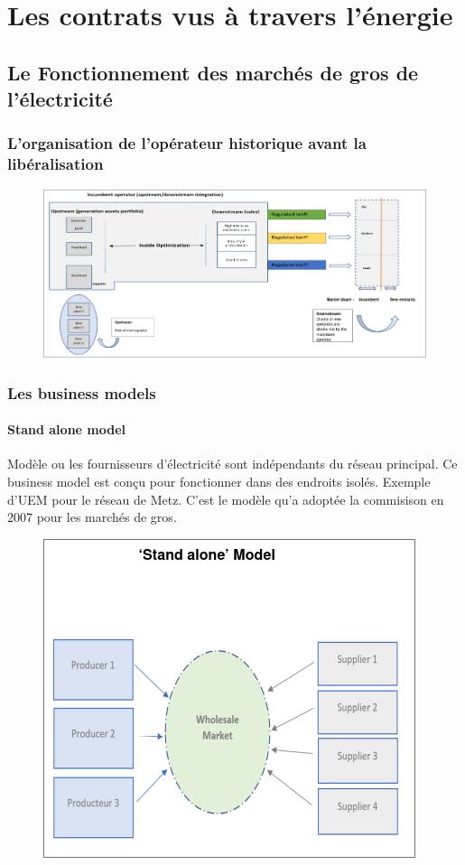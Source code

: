 \chapter{Les contrats vus à travers l'énergie}
\section{Le Fonctionnement des marchés de gros de l'électricité}
\subsection{L’organisation de l’opérateur historique avant la libéralisation}
\begin{figure}[hbt!]
    \includegraphics[scale=0.4]{Pics/marche_de_l_electricite_avant_liberalisation.png}
\end{figure}
\newpage
\subsection{Les business models}
\subsubsection{Stand alone model}
Modèle ou les fournisseurs d'électricité sont indépendants du réseau principal. Ce business model est conçu pour fonctionner dans des endroits isolés. Exemple d'UEM pour le réseau de Metz. \newline
C'est le modèle qu'a adoptée la commisison en 2007 pour les marchés de gros.
\begin{figure}[hbt!]
    \centering
    \includegraphics[scale=0.7]{Pics/Stand_alone_model.png}
\end{figure}
\newpage
